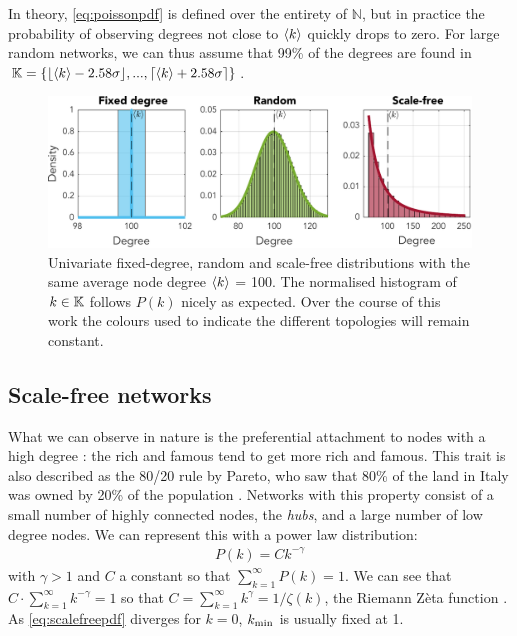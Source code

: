 In theory, \eqref{eq:poissonpdf} is defined over the entirety of $\mathbb{N}$, but in practice the probability of observing degrees not close to ${\langle k\rangle}$ quickly drops to zero. For large random networks, we can thus assume that 99\% of the degrees are found in $\K = \{ \left \lfloor{\kmean - 2.58 \sigma}\right \rfloor, ...,  \left \lceil{\kmean + 2.58 \sigma}\right \rceil \}$.

\begin{figure}[H]
\centering
\includegraphics[width = \textwidth]{../Figures/Distributions/1D.pdf}
\caption{Univariate fixed-degree, random and scale-free distributions with the same average node degree ${\langle k\rangle}$ = 100. The normalised histogram of $k \in {\mathbb{K}}$ follows $P(k)$ nicely as expected. Over the course of this work the colours used to indicate the different topologies will remain constant.}
\label{fig:1Dpdfs}
\end{figure}


\subsection{Scale-free networks}
What we can observe in nature is the preferential attachment to nodes with a high degree \cite{Bullmore2010}: the rich and famous tend to get more rich and famous. This trait is also described as the 80/20 rule by Pareto, who saw that 80\% of the land in Italy was owned by 20\% of the population \cite{BarabasiNetworkBook2016}. Networks with this property consist of a small number of highly connected nodes, the \textsl{hubs}, and a large number of low degree nodes. We can represent this with a power law distribution:
\begin{align}
P(k) = C k^{-\gamma} \label{eq:scalefreepdf}
\end{align}
with $\gamma > 1$ and $C$ a constant so that $\sum_{k=1}^{\infty} P(k) = 1$. We can see that $C \cdot \sum_{k=1}^{\infty} k^{-\gamma} = 1$ so that $C = \sum_{k=1}^{\infty} k^{\gamma} = 1/\zeta(k)$, the Riemann Z{\`e}ta function \cite{BarabasiNetworkBook2016}. As \eqref{eq:scalefreepdf} diverges for $k = 0$, $k_{\text{min}}$ is usually fixed at 1.\\


